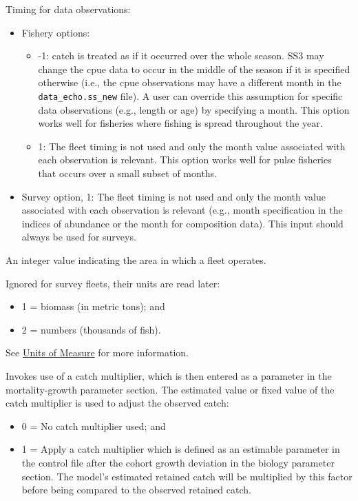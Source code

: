 \hypertarget{ObsTiming}{}
Timing for data observations:
\begin{itemize}
	\item Fishery options:
		\begin{itemize}
		    \item -1: catch is treated as if it occurred over the whole season. SS3 may change the \gls{cpue} data to occur in the middle of the season if it is specified otherwise (i.e., the \gls{cpue} observations may have a different month in the \texttt{data\_echo.ss\_new} file). A user can override this assumption for specific data observations (e.g., length or age) by specifying a month. This option works well for fisheries where fishing is spread throughout the year.
			\item 1: The fleet timing is not used and only the month value associated with each observation is relevant. This option works well for pulse fisheries that occurs over a small subset of months.
		\end{itemize}
	\item Survey option, 1: The fleet timing is not used and only the month value associated with each observation is relevant (e.g., month specification in the indices of abundance or the month for composition data). This input should always be used for surveys.
\end{itemize}	  
	  
An integer value indicating the area in which a fleet operates.

Ignored for survey fleets, their units are read later:
\begin{itemize}
	\item 1 = biomass (in metric tons); and
	\item 2 = numbers (thousands of fish).
\end{itemize}   
See \hyperlink{UnitsOfMeasure}{Units of Measure} for more information.

\hypertarget{CatchMult}{}
Invokes use of a catch multiplier, which is then entered as a parameter in the mortality-growth parameter section. The estimated value or fixed value of the catch multiplier is used to adjust the observed catch:
\begin{itemize}
  	\item 0 = No catch multiplier used; and
  	\item 1 = Apply a catch multiplier which is defined as an estimable parameter in the control file after the cohort growth deviation in the biology parameter section. The model's estimated retained catch will be multiplied by this factor before being compared to the observed retained catch.
\end{itemize} 
	  

